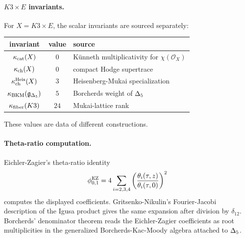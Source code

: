 \paragraph{$K3\times E$ invariants.}
For $X=K3\times E$, the scalar invariants are sourced separately:
\begin{center}
\begin{tabular}{c|c|l}
invariant & value & source\\
\hline
\(\kappa_{\mathrm{cat}}(X)\) & \(0\) & K\"unneth multiplicativity for \(\chi(\mathcal O_X)\)\\
\(\kappa_{\mathrm{ch}}(X)\) & \(0\) & compact Hodge supertrace\\
\(\kappa_{\mathrm{ch}}^{\mathrm{Heis}}(X)\) & \(3\) & Heisenberg-Mukai specialization\\
\(\kappa_{\mathrm{BKM}}(\mathfrak g_{\Delta_5})\) & \(5\) & Borcherds weight of \(\Delta_5\)\\
\(\kappa_{\mathrm{fiber}}(K3)\) & \(24\) & Mukai-lattice rank
\end{tabular}
\end{center}
These values are data of different constructions.

\paragraph{Theta-ratio computation.}
Eichler-Zagier's theta-ratio identity
\[
  \phi_{0,1}^{\mathrm{EZ}}
  =
  4\sum_{i=2,3,4}
  \left({\theta_i(\tau,z)\over\theta_i(\tau,0)}\right)^2
\]
computes the displayed coefficients. Gritsenko-Nikulin's
Fourier-Jacobi description of the Igusa product gives the same
expansion after division by $\delta_{12}$. Borcherds' denominator
theorem reads the Eichler-Zagier coefficients as root multiplicities in
the generalized Borcherds-Kac-Moody algebra attached to $\Delta_5$.
